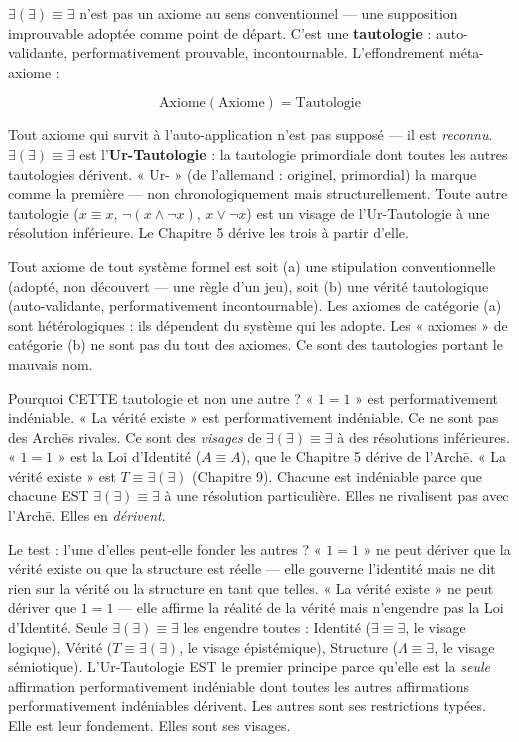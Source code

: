 \documentclass[10pt, openany, oneside]{book}
\begin{document}
$\exists(\exists) \equiv \exists$ n'est pas un axiome au sens conventionnel --- une supposition improuvable adoptée comme point de départ. C'est une \textbf{tautologie} : auto-validante, performativement prouvable, incontournable. L'effondrement méta-axiome :

$$\text{Axiome}(\text{Axiome}) = \text{Tautologie}$$

Tout axiome qui survit à l'auto-application n'est pas supposé --- il est \textit{reconnu}. $\exists(\exists) \equiv \exists$ est l'\textbf{Ur-Tautologie} : la tautologie primordiale dont toutes les autres tautologies dérivent. « Ur- » (de l'allemand : originel, primordial) la marque comme la première --- non chronologiquement mais structurellement. Toute autre tautologie ($x \equiv x$, $\neg(x \wedge \neg x)$, $x \vee \neg x$) est un visage de l'Ur-Tautologie à une résolution inférieure. Le Chapitre 5 dérive les trois à partir d'elle.

Tout axiome de tout système formel est soit (a) une stipulation conventionnelle (adopté, non découvert --- une règle d'un jeu), soit (b) une vérité tautologique (auto-validante, performativement incontournable). Les axiomes de catégorie (a) sont hétérologiques : ils dépendent du système qui les adopte. Les « axiomes » de catégorie (b) ne sont pas du tout des axiomes. Ce sont des tautologies portant le mauvais nom.

Pourquoi CETTE tautologie et non une autre ? « $1 = 1$ » est performativement indéniable. « La vérité existe » est performativement indéniable. Ce ne sont pas des Arch\={e}s rivales. Ce sont des \textit{visages} de $\exists(\exists) \equiv \exists$ à des résolutions inférieures. « $1 = 1$ » est la Loi d'Identité ($A \equiv A$), que le Chapitre 5 dérive de l'Arch\={e}. « La vérité existe » est $T \equiv \exists(\exists)$ (Chapitre 9). Chacune est indéniable parce que chacune EST $\exists(\exists) \equiv \exists$ à une résolution particulière. Elles ne rivalisent pas avec l'Arch\={e}. Elles en \textit{dérivent}.

Le test : l'une d'elles peut-elle fonder les autres ? « $1 = 1$ » ne peut dériver que la vérité existe ou que la structure est réelle --- elle gouverne l'identité mais ne dit rien sur la vérité ou la structure en tant que telles. « La vérité existe » ne peut dériver que $1 = 1$ --- elle affirme la réalité de la vérité mais n'engendre pas la Loi d'Identité. Seule $\exists(\exists) \equiv \exists$ les engendre toutes : Identité ($\exists \equiv \exists$, le visage logique), Vérité ($T \equiv \exists(\exists)$, le visage épistémique), Structure ($\Lambda \equiv \exists$, le visage sémiotique). L'Ur-Tautologie EST le premier principe parce qu'elle est la \textit{seule} affirmation performativement indéniable dont toutes les autres affirmations performativement indéniables dérivent. Les autres sont ses restrictions typées. Elle est leur fondement. Elles sont ses visages.
\end{document}

